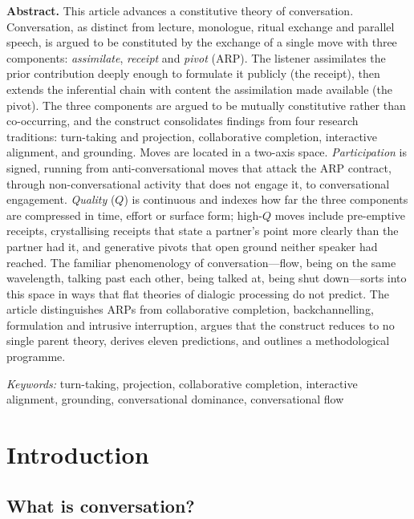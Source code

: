 \maketitle


\noindent\textbf{Abstract.} This article advances a constitutive theory of conversation. Conversation, as distinct from lecture, monologue, ritual exchange and parallel speech, is argued to be constituted by the exchange of a single move with three components: \emph{assimilate}, \emph{receipt} and \emph{pivot} (ARP). The listener assimilates the prior contribution deeply enough to formulate it publicly (the receipt), then extends the inferential chain with content the assimilation made available (the pivot). The three components are argued to be mutually constitutive rather than co-occurring, and the construct consolidates findings from four research traditions: turn-taking and projection, collaborative completion, interactive alignment, and grounding. Moves are located in a two-axis space. \emph{Participation} is signed, running from anti-conversational moves that attack the ARP contract, through non-conversational activity that does not engage it, to conversational engagement. \emph{Quality} ($Q$) is continuous and indexes how far the three components are compressed in time, effort or surface form; high-$Q$ moves include pre-emptive receipts, crystallising receipts that state a partner's point more clearly than the partner had it, and generative pivots that open ground neither speaker had reached. The familiar phenomenology of conversation---flow, being on the same wavelength, talking past each other, being talked at, being shut down---sorts into this space in ways that flat theories of dialogic processing do not predict. The article distinguishes ARPs from collaborative completion, backchannelling, formulation and intrusive interruption, argues that the construct reduces to no single parent theory, derives eleven predictions, and outlines a methodological programme.

\medskip
\noindent\textit{Keywords:} turn-taking, projection, collaborative completion, interactive alignment, grounding, conversational dominance, conversational flow


\section{Introduction}

\subsection{What is conversation?}

